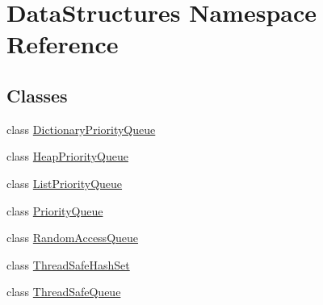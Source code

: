 \hypertarget{namespace_data_structures}{}\section{Data\+Structures Namespace Reference}
\label{namespace_data_structures}
\subsection*{Classes}
\begin{DoxyCompactItemize}
\item 
class \hyperlink{class_data_structures_1_1_dictionary_priority_queue}{Dictionary\+Priority\+Queue}
\item 
class \hyperlink{class_data_structures_1_1_heap_priority_queue}{Heap\+Priority\+Queue}
\item 
class \hyperlink{class_data_structures_1_1_list_priority_queue}{List\+Priority\+Queue}
\item 
class \hyperlink{class_data_structures_1_1_priority_queue}{Priority\+Queue}
\item 
class \hyperlink{class_data_structures_1_1_random_access_queue}{Random\+Access\+Queue}
\item 
class \hyperlink{class_data_structures_1_1_thread_safe_hash_set}{Thread\+Safe\+Hash\+Set}
\item 
class \hyperlink{class_data_structures_1_1_thread_safe_queue}{Thread\+Safe\+Queue}
\end{DoxyCompactItemize}
